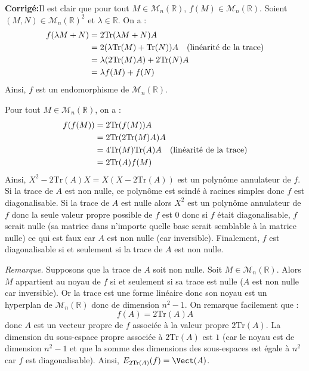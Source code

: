 \documentclass[a4paper,twoside,french,10pt]{VcCours}
\newcommand{\corr}{\textbf{Corrigé:}}
\begin{document}
\corr Il est clair que pour tout $M \in \mathcal{M}_n(\mathbb{R})$, $f(M) \in \mathcal{M}_n(\mathbb{R})$. Soient $(M,N) \in \mathcal{M}_n(\mathbb{R})^2$ et $\lambda \in \mathbb{R}$. On a :
\begin{align*}
f(\lambda M + N) & = 2 \textrm{Tr}(\lambda M + N) A \\
& = 2 (\lambda \textrm{Tr}(M) +  \textrm{Tr}(N))A \quad \hbox{(linéarité de la trace)} \\
& =\lambda (2 \textrm{Tr}(M)A) + 2 \textrm{Tr}(N)A \\
&= \lambda f(M) + f(N)
\end{align*}
Ainsi, $f$ est un endomorphisme de $\mathcal{M}_n(\mathbb{R})$.

%
%

Pour tout $M \in \mathcal{M}_n(\mathbb{R})$, on a :
\begin{align*}
f(f(M)) & =  2\textrm{Tr}(f(M)) A \\
& = 2\textrm{Tr}(2\textrm{Tr}(M) A) A \\
& = 4 \textrm{Tr}(M) \textrm{Tr}(A) A \quad \hbox{(linéarité de la trace)} \\
& = 2 \textrm{Tr}(A) f(M)
\end{align*}
Ainsi, $X^2-2\textrm{Tr}(A)X= X(X- 2 \textrm{Tr}(A))$ est un polynôme annulateur de $f$. Si la trace de $A$ est non nulle, ce polynôme est scindé à racines simples donc $f$ est diagonalisable. Si la trace de $A$ est nulle alors $X^2$ est un polynôme annulateur de $f$ donc la seule valeur propre possible de $f$ est $0$ donc si $f$ était diagonalisable, $f$ serait nulle (sa matrice dans n'importe quelle base serait semblable à la matrice nulle) ce qui est faux car $A$ est non nulle (car inversible). Finalement, $f$ est diagonalisable si et seulement si la trace de $A$ est non nulle.


\textit{Remarque.} Supposons que la trace de $A$ soit non nulle. Soit $M \in \mathcal{M}_n(\mathbb{R})$. Alors $M$ appartient au noyau de $f$ si et seulement si sa trace est nulle ($A$ est non nulle car inversible). Or la trace est une forme linéaire donc son noyau est un hyperplan de $\mathcal{M}_n(\mathbb{R})$ donc de dimension $n^2-1$. On remarque facilement que :
$$ f(A) = 2 \textrm{Tr}(A) A$$
donc $A$ est un vecteur propre de $f$ associée à la valeur propre $2 \textrm{Tr}(A)$. La dimension du sous-espace propre associée à $2 \textrm{Tr}(A)$ est $1$ (car le noyau est de dimension $n^2-1$ et que la somme des dimensions des sous-espaces est égale à $n^2$ car $f$ est diagonalisable). Ainsi, $E_{2\textrm{Tr}(A)}(f) = \Vect(A)$.
\end{document}
